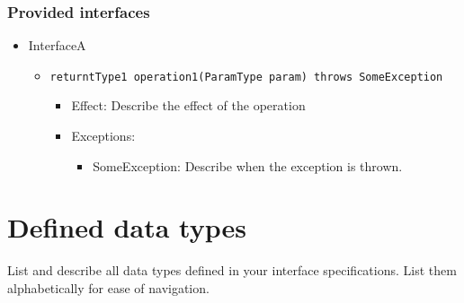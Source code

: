 \documentclass[a4paper,10pt]{article}
\begin{document}
\subsubsection*{Provided interfaces}
\begin{itemize}
    \item InterfaceA
    \begin{itemize}
        \item \texttt{returntType1 operation1(ParamType param) throws SomeException}
        \begin{itemize}
            \item Effect: Describe the effect of the operation
            \item Exceptions:
            \begin{itemize}
                \item SomeException: Describe when the exception is thrown.
            \end{itemize}
		\end{itemize}
    \end{itemize}
\end{itemize}



\section{Defined data types}\label{app:datatypes}
List and describe all data types defined in your interface specifications. List
them alphabetically for ease of navigation.
\end{document}
